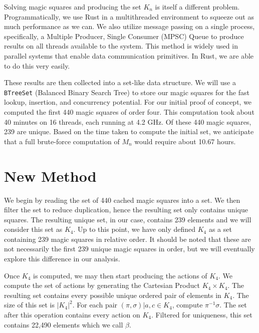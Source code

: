 \documentclass[12pt]{report}
\begin{document}
\par Solving magic squares and producing the set $K_n$ is itself a different problem.
Programmatically, we use Rust in a multithreaded environment to squeeze out as much performance as
we can. We also utilize message passing on a single process, specifically, a Multiple Producer,
Single Consumer (MPSC) Queue to produce results on all threads available to the system. This method
is widely used in parallel systems that enable data communication primitives. In Rust, we are able
to do this very easily.

\par These results are then collected into a set-like data structure. We will use a
\texttt{BTreeSet}
(Balanced Binary Search Tree) to store our magic squares for the fast lookup, insertion, and
concurrency potential. For our initial proof of concept, we computed the first 440 magic squares of
order four. This computation took about 40 minutes on 16 threads, each running at 4.2 GHz. Of these
440 magic squares, 239 are unique. Based on the time taken to compute the initial set, we
anticipate that a full brute-force computation of $M_n$ would require about 10.67 hours.

\section{New Method}
\par We begin by reading the set of 440 cached magic squares into a set. We then filter the set to
reduce duplication, hence the resulting set only contains unique squares. The resulting unique set,
in our case, contains 239 elements and we will consider this set as $K_4$. Up to this point, we
have only defined $K_4$ as a set containing 239 magic squares in relative order. It should be noted
that these are not necessarily the first 239 unique magic squares in order, but we will eventually
explore this difference in our analysis.

\par Once $K_4$ is computed, we may then start producing the actions of $K_4$. We compute the set
of actions by generating the Cartesian Product $K_4 \times K_4$. The resulting set contains every
possible unique ordered pair of elements in $K_4$. The size of this set is $\left|K_4\right|^2$.
For each pair $\left(\pi,\sigma\right)\vert a,c\in K_4$, compute $\pi^{-1}\sigma$. The set after
this operation contains every action on $K_4$. Filtered for uniqueness, this set contains 22,490
elements which we call $\beta$.
\end{document}
